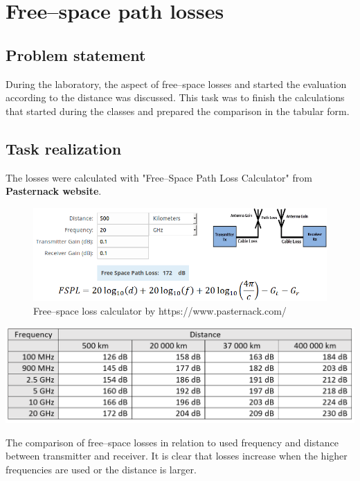 \documentclass[eng,printmode]{mgr}
\begin{document}
\chapter{Free--space path losses}
\section{Problem statement}
During the laboratory, the aspect of free--space losses and started the evaluation according to the distance was discussed. This task was to finish the calculations that started during the classes and prepared the comparison in the tabular form.

\section{Task realization}
The losses were calculated with "Free--Space Path Loss Calculator" from \textbf{Pasternack website}.
\begin{figure}[h]
	\centering
	\includegraphics[width=0.6\linewidth]{pasternack}
	\caption{Free--space loss calculator by https://www.pasternack.com/}
\end{figure}

\begin{table}[h]
	\centering
	\includegraphics[width=0.9\linewidth]{freespace}
	\caption{The comparison of free--space losses in relation to used frequency and distance between transmitter and receiver. It is clear that losses increase when the higher frequencies are used or the distance is larger.}
	\label{fig:freespace}
\end{table}
\end{document}
